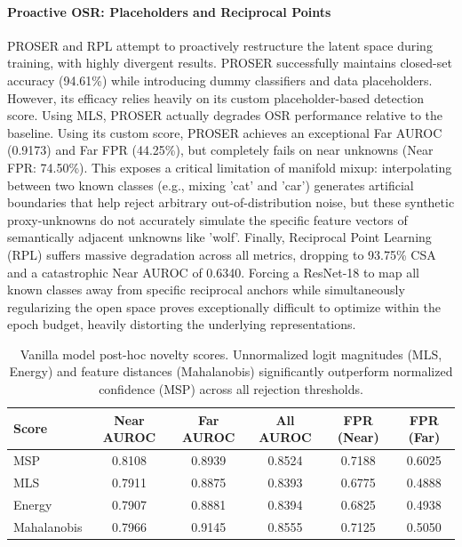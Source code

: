 \documentclass{article}
\begin{document}
\paragraph{Proactive OSR: Placeholders and Reciprocal Points}
PROSER and RPL attempt to proactively restructure the latent space during training, with highly divergent results. PROSER successfully maintains closed-set accuracy (94.61\%) while introducing dummy classifiers and data placeholders. However, its efficacy relies heavily on its custom placeholder-based detection score. Using MLS, PROSER actually degrades OSR performance relative to the baseline. Using its custom score, PROSER achieves an exceptional Far AUROC (0.9173) and Far FPR (44.25\%), but completely fails on near unknowns (Near FPR: 74.50\%). This exposes a critical limitation of manifold mixup: interpolating between two known classes (e.g., mixing 'cat' and 'car') generates artificial boundaries that help reject arbitrary out-of-distribution noise, but these synthetic proxy-unknowns do not accurately simulate the specific feature vectors of semantically adjacent unknowns like 'wolf'. Finally, Reciprocal Point Learning (RPL) suffers massive degradation across all metrics, dropping to 93.75\% CSA and a catastrophic Near AUROC of 0.6340. Forcing a ResNet-18 to map all known classes away from specific reciprocal anchors while simultaneously regularizing the open space proves exceptionally difficult to optimize within the epoch budget, heavily distorting the underlying representations.

\begin{table}[ht]
  \caption{Vanilla model post-hoc novelty scores. Unnormalized logit magnitudes (MLS, Energy) and feature distances (Mahalanobis) significantly outperform normalized confidence (MSP) across all rejection thresholds.}
  \label{tab:osr_posthoc}
  \centering
  \begin{tabular}{lccccc}
    \toprule
    Score & Near AUROC & Far AUROC & All AUROC & FPR (Near) & FPR (Far) \\
    \midrule
    MSP & 0.8108 & 0.8939 & 0.8524 & 0.7188 & 0.6025 \\
    MLS & 0.7911 & 0.8875 & 0.8393 & 0.6775 & 0.4888 \\
    Energy & 0.7907 & 0.8881 & 0.8394 & 0.6825 & 0.4938 \\
    Mahalanobis & 0.7966 & 0.9145 & 0.8555 & 0.7125 & 0.5050 \\
    \bottomrule
  \end{tabular}
\end{table}
\end{document}

